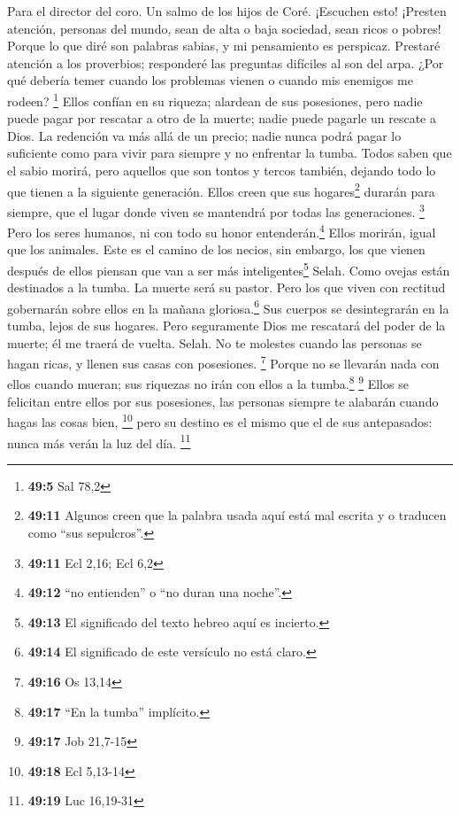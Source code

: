 Para el director del coro. Un salmo de los hijos de Coré. 
¡Escuchen esto! ¡Presten atención, personas del mundo, 
sean de alta o baja sociedad, sean ricos o pobres!  Porque
lo que diré son palabras sabias, y mi pensamiento es perspicaz.
 Prestaré atención a los proverbios; responderé las
preguntas difíciles al son del arpa.  ¿Por qué debería
temer cuando los problemas vienen o cuando mis enemigos me rodeen?
\footnote{\textbf{49:5} Sal 78,2}  Ellos confían en su
riqueza; alardean de sus posesiones,  pero nadie puede
pagar por rescatar a otro de la muerte; nadie puede pagarle un rescate a
Dios.  La redención va más allá de un precio; nadie nunca
podrá pagar lo suficiente  como para vivir para siempre y
no enfrentar la tumba.  Todos saben que el sabio morirá,
pero aquellos que son tontos y tercos también, dejando todo lo que
tienen a la siguiente generación.  Ellos creen que sus
hogares\footnote{\textbf{49:11} Algunos creen que la palabra usada aquí
  está mal escrita y o traducen como ``sus sepulcros''.} durarán para
siempre, que el lugar donde viven se mantendrá por todas las
generaciones. \footnote{\textbf{49:11} Ecl 2,16; Ecl 6,2}
 Pero los seres humanos, ni con todo su honor
entenderán.\footnote{\textbf{49:12} ``no entienden'' o ``no duran una
  noche''.} Ellos morirán, igual que los animales.  Este
es el camino de los necios, sin embargo, los que vienen después de ellos
piensan que van a ser más inteligentes\footnote{\textbf{49:13} El
  significado del texto hebreo aquí es incierto.} Selah. 
Como ovejas están destinados a la tumba. La muerte será su pastor. Pero
los que viven con rectitud gobernarán sobre ellos en la mañana
gloriosa.\footnote{\textbf{49:14} El significado de este versículo no
  está claro.} Sus cuerpos se desintegrarán en la tumba, lejos de sus
hogares.  Pero seguramente Dios me rescatará del poder de
la muerte; él me traerá de vuelta. Selah.  No te molestes
cuando las personas se hagan ricas, y llenen sus casas con posesiones.
\footnote{\textbf{49:16} Os 13,14}  Porque no se llevarán
nada con ellos cuando mueran; sus riquezas no irán con ellos a la
tumba.\footnote{\textbf{49:17} ``En la tumba'' implícito.} \footnote{\textbf{49:17}
  Job 21,7-15}  Ellos se felicitan entre ellos por sus
posesiones, las personas siempre te alabarán cuando hagas las cosas
bien, \footnote{\textbf{49:18} Ecl 5,13-14}  pero su
destino es el mismo que el de sus antepasados: nunca más verán la luz
del día. \footnote{\textbf{49:19} Luc 16,19-31}

